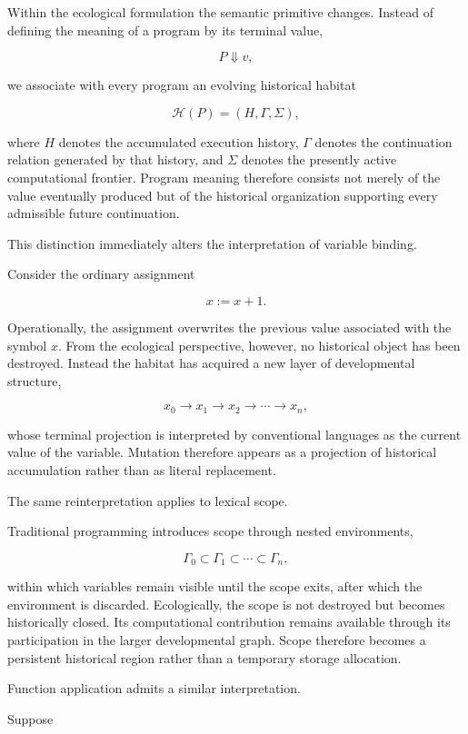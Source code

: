 \documentclass[12pt,oneside]{article}
\theoremstyle{remark}
\begin{document}
Within the ecological formulation the semantic primitive changes. Instead of
defining the meaning of a program by its terminal value,

\[
P
\Downarrow
v,
\]

we associate with every program an evolving historical habitat

\[
\mathcal H(P)
=
(H,\Gamma,\Sigma),
\]

where \(H\) denotes the accumulated execution history,
\(\Gamma\) denotes the continuation relation generated by that history, and
\(\Sigma\) denotes the presently active computational frontier. Program meaning
therefore consists not merely of the value eventually produced but of the
historical organization supporting every admissible future continuation.

This distinction immediately alters the interpretation of variable binding.

Consider the ordinary assignment

\[
x := x+1.
\]

Operationally, the assignment overwrites the previous value associated with the
symbol \(x\). From the ecological perspective, however, no historical object has
been destroyed. Instead the habitat has acquired a new layer of developmental
structure,

\[
x_0
\rightarrow
x_1
\rightarrow
x_2
\rightarrow
\cdots
\rightarrow
x_n,
\]

whose terminal projection is interpreted by conventional languages as the
current value of the variable. Mutation therefore appears as a projection of
historical accumulation rather than as literal replacement.

The same reinterpretation applies to lexical scope.

Traditional programming introduces scope through nested environments,

\[
\Gamma_0
\subset
\Gamma_1
\subset
\cdots
\subset
\Gamma_n,
\]

within which variables remain visible until the scope exits, after which the
environment is discarded. Ecologically, the scope is not destroyed but becomes
historically closed. Its computational contribution remains available through
its participation in the larger developmental graph. Scope therefore becomes a
persistent historical region rather than a temporary storage allocation.

Function application admits a similar interpretation.

Suppose
\end{document}
